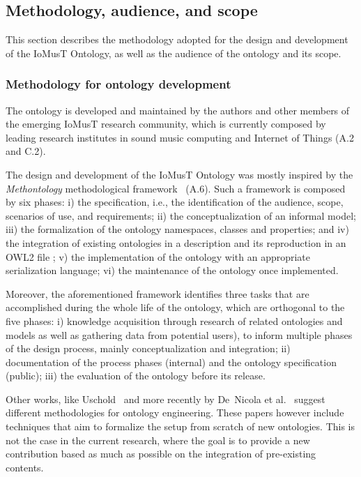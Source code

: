 \subsection{Methodology, audience, and scope}
This section describes the methodology adopted for the design and development of the IoMusT Ontology, as well as the audience of the ontology and its scope.

\subsubsection{\textsf{Methodology for ontology development}}
The ontology is developed and maintained by the authors and other members of the emerging IoMusT research community, which is currently composed by leading research institutes in sound music computing and Internet of Things (A.2 and C.2).

The design and development of the IoMusT Ontology was mostly inspired by the \textit{Methontology} methodological framework~\cite{fernandez1997methontology} (A.6). Such a framework is composed by six phases: i) the specification, i.e., the identification of the audience, scope, scenarios of use, and requirements; ii) the conceptualization of an informal model; iii) the formalization of the ontology namespaces, classes and properties; and iv) the integration of existing ontologies in a description and its reproduction in an OWL2 file \cite{motik2009owl}; v) the implementation of the ontology with an appropriate serialization language; vi) the maintenance of the ontology once implemented.

Moreover, the aforementioned framework identifies three tasks that are accomplished during the whole life of the ontology, which are orthogonal to the five phases: i) knowledge acquisition through research of related ontologies and models as well as gathering data from potential users), to inform multiple phases of the design process, mainly conceptualization and integration; ii) documentation of the process phases (internal) and the ontology specification (public); iii) the evaluation of the ontology before its release. 

Other works, like Uschold~\cite{uschold1996building} and more recently by De~Nicola et al.~\cite{de2016lightweight} suggest different methodologies for ontology engineering. These papers however include techniques that aim to formalize the setup from scratch of new ontologies. This is not the case in the current research, where the goal is to provide a new contribution based as much as possible on the integration of pre-existing contents.

